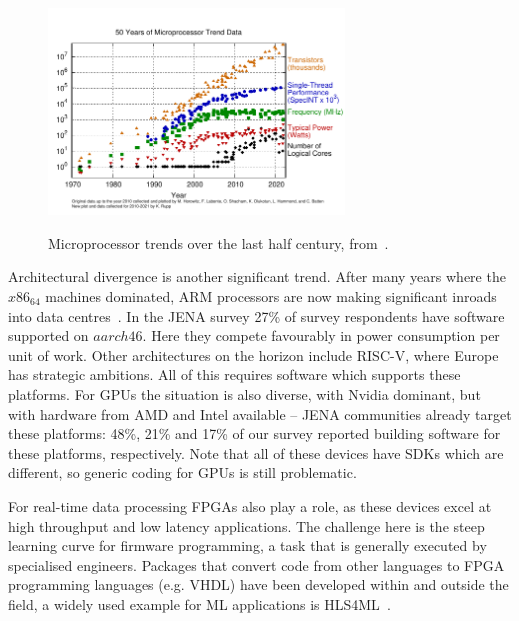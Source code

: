 \begin{figure}[htbp]
\begin{center}
\includegraphics[width=0.7\textwidth]{figures/50-years-processor-trend.pdf} \\ 
\caption{Microprocessor trends over the last half century, from~\cite{KRupp_Microprocessor_Data}.}
\label{figures:Fig5}
\end{center}
\end{figure}


Architectural divergence is another significant trend. After many years where the $x86_64$ machines dominated, ARM processors are now making significant inroads into data centres~\cite{ARM_Datacentre}. In the JENA survey 27\% of survey respondents have software supported on $aarch46$. Here they compete favourably in power consumption per unit of work. Other architectures on the horizon include RISC-V, where Europe has strategic ambitions. All of this requires software which supports these platforms. For GPUs the situation is also diverse, with Nvidia dominant\cite{Datacentre_report}, but with hardware from AMD and Intel available -- JENA communities already target these platforms: 48\%, 21\% and 17\% of our survey reported building software for these platforms, respectively. Note that all of these devices have SDKs which are different, so generic coding for GPUs is still problematic. 

For real-time data processing FPGAs also play a role, as these devices excel at high throughput and low latency applications. The challenge here is the steep learning curve for firmware programming, a task that is generally executed by specialised engineers. Packages that convert code from other languages to FPGA programming languages (e.g. VHDL) have been developed within and outside the field, a widely used example for ML applications is HLS4ML~\cite{Duarte:2018ite}.


